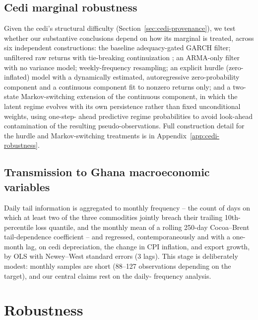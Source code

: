 \documentclass[final,3p,times,authoryear]{elsarticle}
\begin{document}
\subsection{Cedi marginal robustness}
\label{sec:cedi-robustness-method}

Given the cedi's structural difficulty (Section~\ref{sec:cedi-provenance}),
we test whether our substantive conclusions depend on how its marginal
is treated, across six independent constructions: the baseline
adequacy-gated GARCH filter; unfiltered raw returns with tie-breaking
continuization \citep[following][]{denuit2005}; an ARMA-only filter with
no variance model; weekly-frequency resampling; an explicit hurdle
(zero-inflated) model with a dynamically estimated, autoregressive
zero-probability component and a continuous component fit to nonzero
returns only; and a two-state Markov-switching extension of the
continuous component, in which the latent regime evolves with its own
persistence rather than fixed unconditional weights, using one-step-
ahead predictive regime probabilities to avoid look-ahead contamination
of the resulting pseudo-observations. Full construction detail for the
hurdle and Markov-switching treatments is in
Appendix~\ref{app:cedi-robustness}.

\subsection{Transmission to Ghana macroeconomic variables}
\label{sec:transmission-method}

Daily tail information is aggregated to monthly frequency -- the count
of days on which at least two of the three commodities jointly breach
their trailing 10th-percentile loss quantile, and the monthly mean of a
rolling 250-day Cocoa--Brent tail-dependence coefficient -- and
regressed, contemporaneously and with a one-month lag, on cedi
depreciation, the change in CPI inflation, and export growth, by OLS
with Newey--West standard errors \citep{newey1987} (3 lags). This stage
is deliberately modest: monthly samples are short (88--127 observations
depending on the target), and our central claims rest on the daily-
frequency analysis.



\section{Robustness}
\label{sec:robustness}
\end{document}
